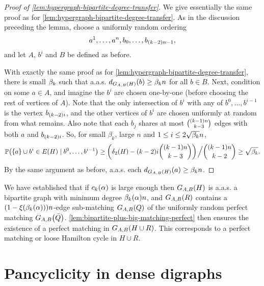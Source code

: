 \documentclass[11pt,english]{article}
\theoremstyle{plain}
\theoremstyle{definition}
\theoremstyle{definition}
\theoremstyle{plain}
\theoremstyle{plain}
\theoremstyle{plain}
\theoremstyle{plain}
\theoremstyle{remark}
\theoremstyle{remark}
\let\originalleft\left
\let\originalright\right
\renewcommand{\left}{\mathopen{}\mathclose\bgroup\originalleft}
\renewcommand{\right}{\aftergroup\egroup\originalright}
\begin{document}
\begin{proof}
[Proof of \ref{lem:hypergraph-bipartite-degree-transfer}]We give
essentially the same proof as for \ref{lem:hypergraph-bipartite-degree-transfer}. As in the discussion preceding the lemma, choose a uniformly random ordering
\[
a^{1},\dots,a^{n},b_{0},\dots,b_{\left(k-2\right)n-1},
\]
and let $A$, $b^i$ and $B$ be defined as before.

With exactly the same proof as for \ref{lem:hypergraph-bipartite-degree-transfer},
there is small $\beta_k$ such that a.a.s.{} $d_{G_{A,B}\left(H\right)}\left(b\right)\ge\aham n$
for all $b\in B$. Next, condition on some $a\in A$, and imagine the $b^i$ are chosen one-by-one
(before choosing the rest of vertices of $A$). Note  that the only intersection of $b^i$ with any of $b^0,\dots,b^{i-1}$ is the vertex $b_{\left(k-2\right)i}$, and the other vertices of $b^i$ are chosen uniformly at random from what remains. Also note that each $b_j$ shares at most ${\left(k-1\right)n \choose k-3}$ edges with both $a$ and $b_{\left(k-2\right)i}$. So, for small $\beta_k$, large $n$
and $1\le i\le2\sqrt{\beta_k}n$,
\[
\Pr\left(\left\{ a\right\} \cup b^{i}\in E\left(H\right)\mid b^{0},\dots,b^{i-1}\right)\ge\left(\delta_{2}\left(H\right)-\left(k-2\right)i{\left(k-1\right)n \choose k-3}\right)\left.\vphantom{\sum}\right/{ \left(k-1\right)n \choose k-2}\ge\sqrt{\aham}.
\]
By the same argument as before, a.a.s.{} each $d_{G_{A,B}\left(H\right)}\left(a\right)\ge\aham n$.
\end{proof}
We have established that if $\chyp\left(\alpha\right)$ 
is large enough then $G_{A,B}\left(H\right)$ is a.a.s.{} a bipartite graph with minimum degree $\a\left(\alpha\right)n$, and $G_{A,B}\left(R\right)$ contains a $\left(1-\xi\left(\a\left(\alpha\right)\right)\right)n$-edge sub-matching $G_{A,B}\left(Q\right)$ of the uniformly random perfect matching $G_{A,B}\left(\bar{Q}\right)$. \ref{lem:bipartite-plus-big-matching-perfect} then
ensures the existence of a perfect matching in $G_{A,B}\left(H\cup R\right)$. This corresponds to a perfect matching or loose Hamilton cycle in $H\cup R$.


\section{\label{sec:digraphs}Pancyclicity in dense digraphs}
\end{document}
